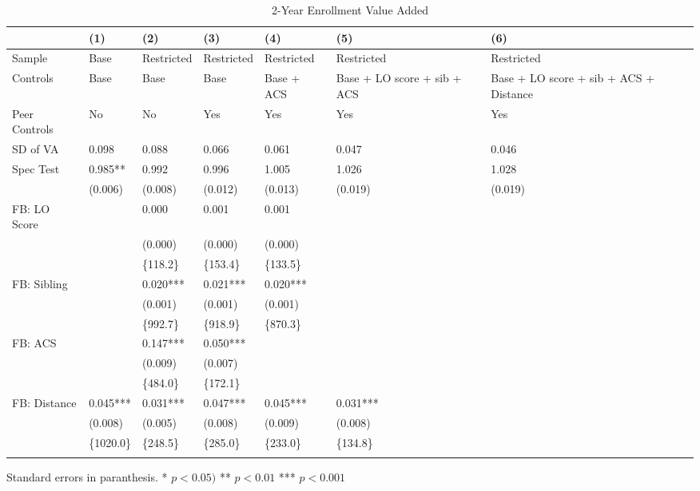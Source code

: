 \begin{table}[tbp] \centering
{}

\caption{2-Year Enrollment Value Added}
{\footnotesize
\begin{tabularx}{\linewidth}{lCCCCCC}

\toprule
&{(1)}&{(2)}&{(3)}&{(4)}&{(5)}&{(6)} \tabularnewline
\midrule \addlinespace[\belowrulesep]
Sample&Base&Restricted&Restricted&Restricted&Restricted&Restricted \tabularnewline
Controls&Base&Base&Base&Base + ACS&Base + LO score + sib + ACS&Base + LO score + sib + ACS + Distance \tabularnewline
Peer Controls&No&No&Yes&Yes&Yes&Yes \tabularnewline
\midrule SD of VA&0.098&0.088&0.066&0.061&0.047&0.046 \tabularnewline
Spec Test&0.985**&0.992&0.996&1.005&1.026&1.028 \tabularnewline
&(0.006)&(0.008)&(0.012)&(0.013)&(0.019)&(0.019) \tabularnewline
FB: LO Score&&0.000&0.001&0.001&& \tabularnewline
&&(0.000)&(0.000)&(0.000)&& \tabularnewline
&&\{118.2\}&\{153.4\}&\{133.5\}&& \tabularnewline
FB: Sibling&&0.020***&0.021***&0.020***&& \tabularnewline
&&(0.001)&(0.001)&(0.001)&& \tabularnewline
&&\{992.7\}&\{918.9\}&\{870.3\}&& \tabularnewline
FB: ACS&&0.147***&0.050***&&& \tabularnewline
&&(0.009)&(0.007)&&& \tabularnewline
&&\{484.0\}&\{172.1\}&&& \tabularnewline
FB: Distance&0.045***&0.031***&0.047***&0.045***&0.031***& \tabularnewline
&(0.008)&(0.005)&(0.008)&(0.009)&(0.008)& \tabularnewline
&\{1020.0\}&\{248.5\}&\{285.0\}&\{233.0\}&\{134.8\}& \tabularnewline
\bottomrule \addlinespace[\belowrulesep]

\end{tabularx}
\begin{flushleft}
\footnotesize Standard errors in paranthesis. * \(p<0.05)\) ** \(p<0.01\) *** \(p<0.001\)
\end{flushleft}
}
\end{table}

